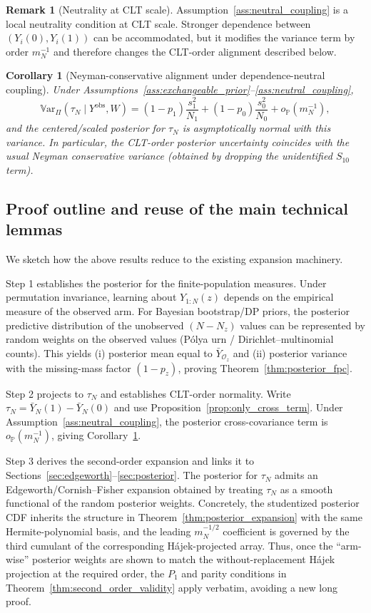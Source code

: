 \documentclass[aos]{imsart}
\newtheorem{corollary}{Corollary}
\theoremstyle{definition}
\newtheorem{remark}{Remark}
\theoremstyle{plain}
\newcommand{\Var}{\mathbb{V}\mathrm{ar}}
\begin{document}
\begin{remark}[Neutrality at CLT scale]\label{rem:neutrality_scale}
Assumption~\ref{ass:neutral_coupling} is a local neutrality condition at CLT scale. Stronger dependence between
$(Y_i(0),Y_i(1))$ can be accommodated, but it modifies the variance term by order $m_N^{-1}$ and therefore changes the
CLT-order alignment described below.
\end{remark}

\begin{corollary}[Neyman-conservative alignment under dependence-neutral coupling]\label{cor:neyman_conservative}
Under Assumptions~\ref{ass:exchangeable_prior}--\ref{ass:neutral_coupling},
\[
\Var_{\Pi}(\tau_N\mid Y^{\mathrm{obs}},W)
=
(1-p_1)\frac{s_1^2}{N_1}
+
(1-p_0)\frac{s_0^2}{N_0}
+o_{\mathbb P}(m_N^{-1}),
\]
and the centered/scaled posterior for $\tau_N$ is asymptotically normal with this variance.
In particular, the CLT-order posterior uncertainty coincides with the usual
Neyman conservative variance (obtained by dropping the unidentified $S_{10}$ term).
\end{corollary}

\subsection{Proof outline and reuse of the main technical lemmas}

We sketch how the above results reduce to the existing expansion machinery.

Step 1 establishes the posterior for the finite-population measures. Under permutation invariance, learning about $Y_{1:N}(z)$ depends on the empirical
measure of the observed arm.
For Bayesian bootstrap/DP priors, the posterior predictive distribution of the
unobserved $(N-N_z)$ values can be represented by random weights on the observed values
(P{\'o}lya urn / Dirichlet--multinomial counts). This yields (i) posterior mean equal to
$\bar Y_{\mathcal O_z}$ and (ii) posterior variance with the missing-mass factor $(1-p_z)$,
proving Theorem~\ref{thm:posterior_fpc}.

Step 2 projects to $\tau_N$ and establishes CLT-order normality. Write $\tau_N=\bar Y_N(1)-\bar Y_N(0)$ and use Proposition~\ref{prop:only_cross_term}.
Under Assumption~\ref{ass:neutral_coupling}, the posterior cross-covariance term is
$o_{\mathbb P}(m_N^{-1})$, giving Corollary~\ref{cor:neyman_conservative}.

Step 3 derives the second-order expansion and links it to Sections~\ref{sec:edgeworth}--\ref{sec:posterior}. The posterior for $\tau_N$ admits an Edgeworth/Cornish--Fisher expansion obtained by
treating $\tau_N$ as a smooth functional of the random posterior weights.
Concretely, the studentized posterior CDF inherits the structure in
Theorem~\ref{thm:posterior_expansion} with the same Hermite-polynomial basis, and the
leading $m_N^{-1/2}$ coefficient is governed by the third cumulant of the corresponding
Hájek-projected array. Thus, once the ``arm-wise'' posterior weights are shown to match
the without-replacement Hájek projection at the required order, the $P_1$ and parity
conditions in Theorem~\ref{thm:second_order_validity} apply verbatim, avoiding a new
long proof.
\end{document}

